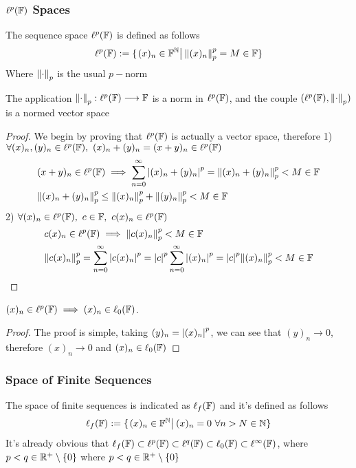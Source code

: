 \documentclass[../complete.tex]{subfiles}
\begin{document}
\subsubsection{$\ell^p(\mathbb{F})$ Spaces}
\begin{dfn}
	The sequence space $\ell^p(\mathbb{F})$ is defined as follows
	\begin{equation}
		\ell^p(\mathbb{F}):=\{\left.(x)_n\in\mathbb{F}^{\mathbb{N}}\right|_{}\norm{(x)_n}_{p}^p=M\in\mathbb{F}\}
		\label{eq:ellpspace}
	\end{equation}
	Where $\norm{\cdot}_{p}$ is the usual $p-$norm
\end{dfn}
\begin{prop}
	The application $\norm{\cdot}_{p}:\ell^p(\mathbb{F})\overset{}{\longrightarrow}\mathbb{F}$ is a norm in $\ell^p(\mathbb{F})$, and the couple $(\ell^p(\mathbb{F}),\norm{\cdot}_{p})$ is a normed vector space
\end{prop}
\begin{proof}
	We begin by proving that $\ell^p(\mathbb{F})$ is actually a vector space, therefore
	1) $\forall(x)_n,(y)_n\in\ell^p(\F),\ (x)_n+(y)_n=(x+y)_n\in\ell^p(\F)$
	\begin{equation*}
		\begin{aligned}
			&(x+y)_n\in\ell^p(\mathbb{F})\implies\sum_{n=0}^\infty\abs{(x)_n+(y)_n}^p=\norm{(x)_n+(y)_n}_{p}^p<M\in\mathbb{F}\\
			&\norm{(x)_n+(y)_n}_{p}^p\le\norm{(x)_n}_{p}^p+\norm{(y)_n}_{p}^p<M\in\mathbb{F}
		\end{aligned}
	\end{equation*}
	2) $\forall(x)_n\in\ell^p(\F),\ c\in\F,\ c(x)_n\in\ell^p(\F)$
	\begin{equation*}
		\begin{aligned}
			&c(x)_n\in\ell^p(\mathbb{F})\implies\norm{c(x)_n}_{p}^p<M\in\mathbb{F}\\
			&\norm{c(x)_n}_{p}^p=\sum_{n=0}^\infty\abs{c(x)_n}^p=\abs{c}^p\sum_{n=0}^\infty\abs{(x)_n}^p=\abs{c}^p\norm{(x)_n}_{p}^p<M\in\mathbb{F}
		\end{aligned}
	\end{equation*}
\end{proof}
\begin{rmk}
	$(x)_n\in\ell^p(\mathbb{F})\implies(x)_n\in\ell_0(\mathbb{F})$.
\end{rmk}
\begin{proof}
	The proof is simple, taking $(y)_n=\abs{(x)_n}^p$, we can see that $(y)_n\to0$, therefore $(x)_n\to0$ and $(x)_n\in\ell_0(\mathbb{F})$
\end{proof}
\subsubsection{Space of Finite Sequences}
\begin{dfn}
	The space of finite sequences is indicated as $\ell_f(\mathbb{F})$ and it's defined as follows
	\begin{equation}
		\ell_f(\F):=\{\derin{(x)_n\in\F^\N}(x)_n=0\ \forall n>N\in\N\}
		\label{eq:ellf}
	\end{equation}
	It's already obvious that $\ell_f(\mathbb{F})\subset\ell^p(\mathbb{F})\subset\ell^q(\mathbb{F})\subset\ell_0(\mathbb{F})\subset\ell^\infty(\mathbb{F})$, where $p<q\in\mathbb{R}^+\setminus\{0\}$ where $p<q\in\mathbb{R}^+\setminus\{0\}$
\end{dfn}
\end{document}
